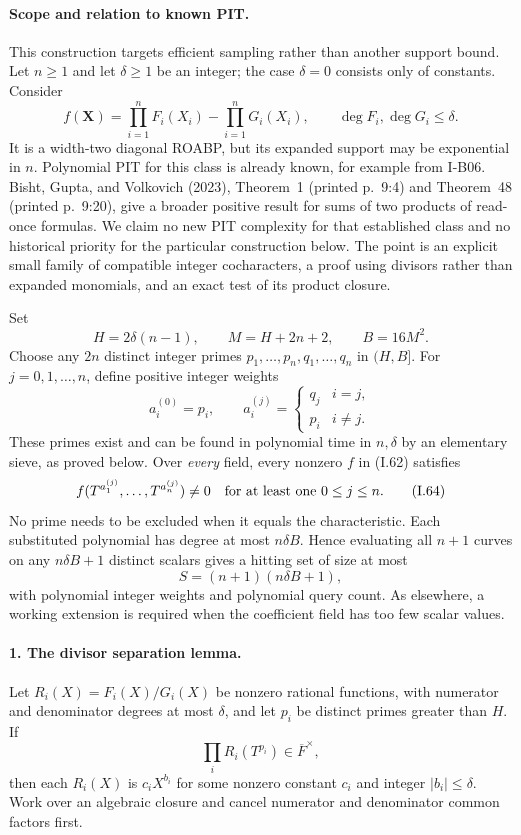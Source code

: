\paragraph{Scope and relation to known PIT.}
This construction targets efficient sampling rather than another
support bound.  Let $n\ge1$ and let $\delta\ge1$ be an integer;
the case $\delta=0$ consists only of constants.  Consider
\[
 f(\mathbf X)=\prod_{i=1}^n F_i(X_i)-\prod_{i=1}^n G_i(X_i),
 \qquad \deg F_i,\deg G_i\le\delta.
 \tag{I.62}
\]
It is a width-two diagonal ROABP, but its expanded support
may be exponential in $n$.  Polynomial PIT for this class
is already known, for example from I-B06.  Bisht, Gupta,
and Volkovich (2023), Theorem~1 (printed p.~9:4) and
Theorem~48 (printed p.~9:20), give a broader positive result
for sums of two products of read-once formulas.  We claim
no new PIT complexity for that established class and no
historical priority for the particular construction below.
The point is an explicit small family of compatible
integer cocharacters, a proof using divisors rather than
expanded monomials, and an exact test of its product closure.

Set
\[
 H=2\delta(n-1),\qquad M=H+2n+2,\qquad B=16M^2.
\]
Choose any $2n$ distinct integer primes
$p_1,\ldots,p_n,q_1,\ldots,q_n$ in $(H,B]$.
For $j=0,1,\ldots,n$, define positive integer weights
\[
 a_i^{(0)}=p_i,\qquad
 a_i^{(j)}=\begin{cases}q_j&i=j,\\p_i&i\ne j.\end{cases}
 \tag{I.63}
\]
These primes exist and can be found in polynomial time in
$n,\delta$ by an elementary sieve, as proved below.
Over \emph{every} field, every nonzero $f$ in (I.62) satisfies
\[
 f(T^{a_1^{(j)}},\ldots,T^{a_n^{(j)}})\ne0
 \quad\hbox{for at least one }0\le j\le n.
 \tag{I.64}
\]
No prime needs to be excluded when it equals the characteristic.
Each substituted polynomial has degree at most $n\delta B$.
Hence evaluating all $n+1$ curves on any $n\delta B+1$
distinct scalars gives a hitting set of size at most
\[
 S=(n+1)(n\delta B+1),
 \tag{I.65}
\]
with polynomial integer weights and polynomial query count.
As elsewhere, a working extension is required when the
coefficient field has too few scalar values.

\paragraph{1. The divisor separation lemma.}
Let $R_i(X)=F_i(X)/G_i(X)$ be nonzero rational functions,
with numerator and denominator degrees at most $\delta$,
and let $p_i$ be distinct primes greater than $H$.
If
\[
 \prod_i R_i(T^{p_i})\in\overline F^{\times},
 \tag{I.66}
\]
then each $R_i(X)$ is $c_iX^{b_i}$ for some nonzero
constant $c_i$ and integer $|b_i|\le\delta$.
Work over an algebraic closure and cancel numerator and
denominator common factors first.

